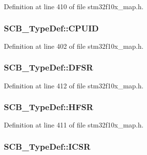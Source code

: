 Definition at line 410 of file stm32f10x\+\_\+map.\+h.

\subsubsection[{\texorpdfstring{C\+P\+U\+ID}{CPUID}}]{ S\+C\+B\+\_\+\+Type\+Def\+::\+C\+P\+U\+ID}\hypertarget{struct_s_c_b___type_def_a573e25c88528bf57e6102c2f58bfbebb}{}\label{struct_s_c_b___type_def_a573e25c88528bf57e6102c2f58bfbebb}


Definition at line 402 of file stm32f10x\+\_\+map.\+h.

\subsubsection[{\texorpdfstring{D\+F\+SR}{DFSR}}]{ S\+C\+B\+\_\+\+Type\+Def\+::\+D\+F\+SR}\hypertarget{struct_s_c_b___type_def_aa65ab0c1b8f69d60734e45dd47b42905}{}\label{struct_s_c_b___type_def_aa65ab0c1b8f69d60734e45dd47b42905}


Definition at line 412 of file stm32f10x\+\_\+map.\+h.

\subsubsection[{\texorpdfstring{H\+F\+SR}{HFSR}}]{ S\+C\+B\+\_\+\+Type\+Def\+::\+H\+F\+SR}\hypertarget{struct_s_c_b___type_def_a409abf8bf83a27ddbf4bb02a824cd683}{}\label{struct_s_c_b___type_def_a409abf8bf83a27ddbf4bb02a824cd683}


Definition at line 411 of file stm32f10x\+\_\+map.\+h.

\subsubsection[{\texorpdfstring{I\+C\+SR}{ICSR}}]{ S\+C\+B\+\_\+\+Type\+Def\+::\+I\+C\+SR}\hypertarget{struct_s_c_b___type_def_a8c461c728ecfcfe29386bd9a5451ef70}{}\label{struct_s_c_b___type_def_a8c461c728ecfcfe29386bd9a5451ef70}


